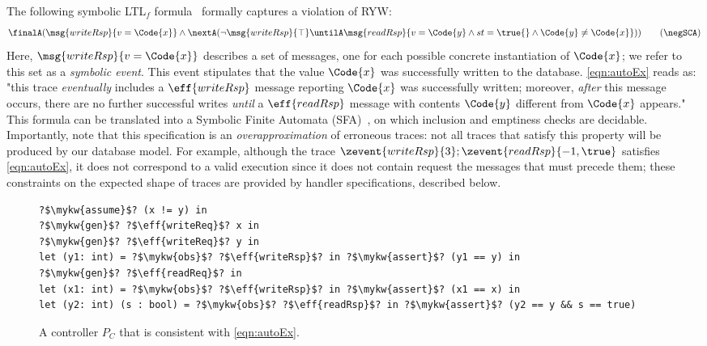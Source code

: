 The following symbolic LTL$_f$ formula~\cite{LTLf} formally captures a
violation of RYW: %
{\footnotesize
  \begin{align} \finalA (\msg{writeRsp}{v = \Code{x} }
    \land \nextA (\neg \msg{writeRsp}{\top} \untilA
    \msg{readRsp}{v = \Code{y} \land st = \true{} \land \Code{y} \not =
    \Code{x}})
    )
    \label{eqn:autoEx}\tag{$\negSCA$}
  \end{align} } %
\noindent
Here, $\msg{writeRsp}{v = \Code{x}}$ describes a set of messages, one
for each possible concrete instantiation of $\Code{x}$; we refer to
this set as a \emph{symbolic event}. This event stipulates that the
value $\Code{x}$ was successfully written to the
database. \ref{eqn:autoEx} reads as: "this trace \emph{eventually}
includes a $\eff{writeRsp}$ message reporting $\Code{x}$ was
successfully written; moreover, \emph{after} this message occurs,
there are no further successful writes \emph{until} a $\eff{readRsp}$
message with contents $\Code{y}$ different from $\Code{x}$ appears."
This formula can be translated into a Symbolic Finite Automata
(SFA)~\cite{SFA-minimization,SFA-Transducers}, on which inclusion and
emptiness checks are decidable. Importantly, note that this
specification is an \emph{overapproximation} of erroneous traces:
not all traces that satisfy this property will be produced by our
database model. For example, although the trace
$\zevent{writeRsp}{3};\zevent{readRsp}{-1,\true}$ satisfies
\ref{eqn:autoEx}, it does not correspond to a valid execution since it
does not contain request the messages that must precede them; these
constraints on the expected shape of traces are provided by handler
specifications, described below.

\begin{figure}
    \centering
\begin{verbatim}
?$\mykw{assume}$? (x != y) in
?$\mykw{gen}$? ?$\eff{writeReq}$? x in
?$\mykw{gen}$? ?$\eff{writeReq}$? y in
let (y1: int) = ?$\mykw{obs}$? ?$\eff{writeRsp}$? in ?$\mykw{assert}$? (y1 == y) in
?$\mykw{gen}$? ?$\eff{readReq}$? in
let (x1: int) = ?$\mykw{obs}$? ?$\eff{writeRsp}$? in ?$\mykw{assert}$? (x1 == x) in
let (y2: int) (s : bool) = ?$\mykw{obs}$? ?$\eff{readRsp}$? in ?$\mykw{assert}$? (y2 == y && s == true)
\end{verbatim}
\vspace*{-.1in}
\caption{A controller $P_{C}$ that is consistent with \ref{eqn:autoEx}. }\label{fig:2pc-term}
\vspace*{-.2in}
\end{figure}

